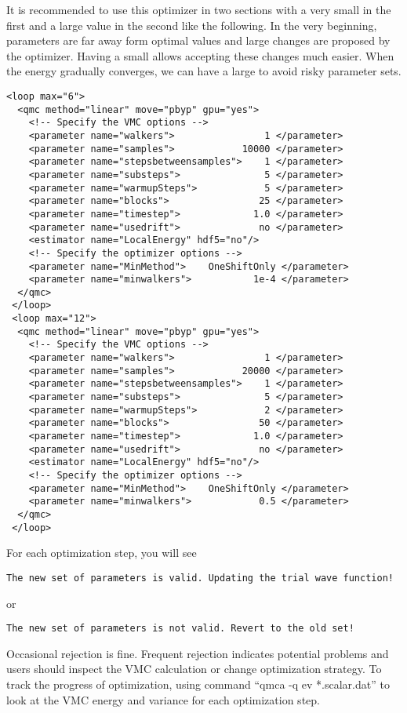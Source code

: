 It is recommended to use this optimizer in two sections with a very small  in the first and a large value in the second like the following.
In the very beginning, parameters are far away form optimal values and large changes are proposed by the optimizer.
Having a small  allows accepting these changes much easier.
When the energy gradually converges, we can have a large  to avoid risky parameter sets.
\begin{lstlisting}[style=QMCPXML]
 <loop max="6">
  <qmc method="linear" move="pbyp" gpu="yes">
    <!-- Specify the VMC options -->
    <parameter name="walkers">                1 </parameter>
    <parameter name="samples">            10000 </parameter>
    <parameter name="stepsbetweensamples">    1 </parameter>
    <parameter name="substeps">               5 </parameter>
    <parameter name="warmupSteps">            5 </parameter>
    <parameter name="blocks">                25 </parameter>
    <parameter name="timestep">             1.0 </parameter>
    <parameter name="usedrift">              no </parameter>
    <estimator name="LocalEnergy" hdf5="no"/>
    <!-- Specify the optimizer options -->
    <parameter name="MinMethod">    OneShiftOnly </parameter>
    <parameter name="minwalkers">           1e-4 </parameter>
  </qmc>
 </loop>
 <loop max="12">
  <qmc method="linear" move="pbyp" gpu="yes">
    <!-- Specify the VMC options -->
    <parameter name="walkers">                1 </parameter>
    <parameter name="samples">            20000 </parameter>
    <parameter name="stepsbetweensamples">    1 </parameter>
    <parameter name="substeps">               5 </parameter>
    <parameter name="warmupSteps">            2 </parameter>
    <parameter name="blocks">                50 </parameter>
    <parameter name="timestep">             1.0 </parameter>
    <parameter name="usedrift">              no </parameter>
    <estimator name="LocalEnergy" hdf5="no"/>
    <!-- Specify the optimizer options -->
    <parameter name="MinMethod">    OneShiftOnly </parameter>
    <parameter name="minwalkers">            0.5 </parameter>
  </qmc>
 </loop>
\end{lstlisting}

For each optimization step, you will see
\begin{lstlisting}
The new set of parameters is valid. Updating the trial wave function!
\end{lstlisting}
or
\begin{lstlisting}
The new set of parameters is not valid. Revert to the old set!
\end{lstlisting}
Occasional rejection is fine. Frequent rejection indicates potential problems and users should inspect the VMC calculation or change optimization strategy.
To track the progress of optimization, using command ``qmca -q ev *.scalar.dat'' to look at the VMC energy and variance for each optimization step.

